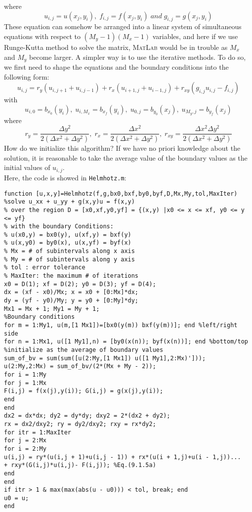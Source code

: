 \documentclass[a4paper]{article}
\begin{document}
where
\begin{equation}
{u_{i,j}} = u({x_j},{y_i}),\;{f_{i,j}} = f({x_j},{y_i})\;and\;{g_{i,j}} = g({x_j},{y_i})
\end{equation}
These equation can somehow be arranged into a linear system of simultaneous equations with respect to $({M_y} - 1)({M_x} - 1)$ variables, and here if we use Runge-Kutta method to solve the matrix, \textsc{MatLab} would be in trouble as ${M_x}$ and ${M_y}$ become larger. A simpler way is to use the iterative methods. To do so, we first need to shape the equations and the boundary conditions into the following form:
\begin{equation}
{u_{i,j}} = {r_y}({u_{i,j + 1}} + {u_{i,j - 1}}) + {r_x}({u_{i + 1,j}} + {u_{i - 1,j}}) + {r_{xy}}({g_{i,j}}{u_{i,j}} - {f_{i,j}})
\end{equation}
with
\begin{equation}
{u_{i,0}} = {b_{{x_0}}}({y_i}),\;{u_{i,{M_x}}} = {b_{{x_f}}}({y_i}),\;{u_{0,j}} = {b_{{y_0}}}({x_j}),\;{u_{{M_y},j}} = {b_{{y_f}}}({x_j})
\end{equation}
where
\begin{equation}
{r_y} = \frac{{\Delta {y^2}}}{{2(\Delta {x^2} + \Delta {y^2})}},\;{r_x} = \frac{{\Delta {x^2}}}{{2(\Delta {x^2} + \Delta {y^2})}},\;{r_{xy}} = \frac{{\Delta {x^2}\Delta {y^2}}}{{2(\Delta {x^2} + \Delta {y^2})}}
\end{equation}
How do we initialize this algorithm? If we have no priori knowledge about the solution, it is reasonable to take the average value of the boundary values as the initial values of ${u_{i,j}}$.\\
Here, the code is showed in \verb$Helmhotz.m$:
\begin{verbatim}
function [u,x,y]=Helmhotz(f,g,bx0,bxf,by0,byf,D,Mx,My,tol,MaxIter)
%solve u_xx + u_yy + g(x,y)u = f(x,y)
% over the region D = [x0,xf,y0,yf] = {(x,y) |x0 <= x <= xf, y0 <= y <= yf}
% with the boundary Conditions:
% u(x0,y) = bx0(y), u(xf,y) = bxf(y)
% u(x,y0) = by0(x), u(x,yf) = byf(x)
% Mx = # of subintervals along x axis
% My = # of subintervals along y axis
% tol : error tolerance
% MaxIter: the maximum # of iterations
x0 = D(1); xf = D(2); y0 = D(3); yf = D(4);
dx = (xf - x0)/Mx; x = x0 + [0:Mx]*dx;
dy = (yf - y0)/My; y = y0 + [0:My]*dy;
Mx1 = Mx + 1; My1 = My + 1;
%Boundary conditions
for m = 1:My1, u(m,[1 Mx1])=[bx0(y(m)) bxf(y(m))]; end %left/right side
for n = 1:Mx1, u([1 My1],n) = [by0(x(n)); byf(x(n))]; end %bottom/top
%initialize as the average of boundary values
sum_of_bv = sum(sum([u(2:My,[1 Mx1]) u([1 My1],2:Mx)']));
u(2:My,2:Mx) = sum_of_bv/(2*(Mx + My - 2));
for i = 1:My
for j = 1:Mx
F(i,j) = f(x(j),y(i)); G(i,j) = g(x(j),y(i));
end
end
dx2 = dx*dx; dy2 = dy*dy; dxy2 = 2*(dx2 + dy2);
rx = dx2/dxy2; ry = dy2/dxy2; rxy = rx*dy2;
for itr = 1:MaxIter
for j = 2:Mx
for i = 2:My
u(i,j) = ry*(u(i,j + 1)+u(i,j - 1)) + rx*(u(i + 1,j)+u(i - 1,j))...
+ rxy*(G(i,j)*u(i,j)- F(i,j)); %Eq.(9.1.5a)
end
end
if itr > 1 & max(max(abs(u - u0))) < tol, break; end
u0 = u;
end
\end{verbatim}
\end{document}

